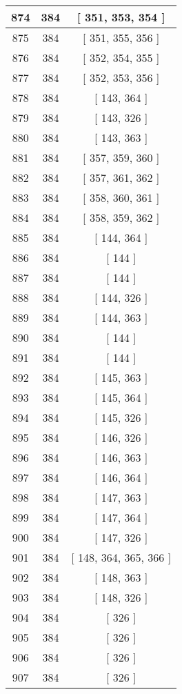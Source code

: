 \begin{center}
\begin{longtable}[H]{|| c c c ||}
\hline
874 & 384 & [ 351, 353, 354 ] \\ 
\hline
875 & 384 & [ 351, 355, 356 ] \\ 
\hline
876 & 384 & [ 352, 354, 355 ] \\ 
\hline
877 & 384 & [ 352, 353, 356 ] \\ 
\hline
878 & 384 & [ 143, 364 ] \\ 
\hline
879 & 384 & [ 143, 326 ] \\ 
\hline
880 & 384 & [ 143, 363 ] \\ 
\hline
881 & 384 & [ 357, 359, 360 ] \\ 
\hline
882 & 384 & [ 357, 361, 362 ] \\ 
\hline
883 & 384 & [ 358, 360, 361 ] \\ 
\hline
884 & 384 & [ 358, 359, 362 ] \\ 
\hline
885 & 384 & [ 144, 364 ] \\ 
\hline
886 & 384 & [ 144 ] \\ 
\hline
887 & 384 & [ 144 ] \\ 
\hline
888 & 384 & [ 144, 326 ] \\ 
\hline
889 & 384 & [ 144, 363 ] \\ 
\hline
890 & 384 & [ 144 ] \\ 
\hline
891 & 384 & [ 144 ] \\ 
\hline
892 & 384 & [ 145, 363 ] \\ 
\hline
893 & 384 & [ 145, 364 ] \\ 
\hline
894 & 384 & [ 145, 326 ] \\ 
\hline
895 & 384 & [ 146, 326 ] \\ 
\hline
896 & 384 & [ 146, 363 ] \\ 
\hline
897 & 384 & [ 146, 364 ] \\ 
\hline
898 & 384 & [ 147, 363 ] \\ 
\hline
899 & 384 & [ 147, 364 ] \\ 
\hline
900 & 384 & [ 147, 326 ] \\ 
\hline
901 & 384 & [ 148, 364, 365, 366 ] \\ 
\hline
902 & 384 & [ 148, 363 ] \\ 
\hline
903 & 384 & [ 148, 326 ] \\ 
\hline
904 & 384 & [ 326 ] \\ 
\hline
905 & 384 & [ 326 ] \\ 
\hline
906 & 384 & [ 326 ] \\ 
\hline
907 & 384 & [ 326 ] \\ 
\hline

\end{longtable}
\end{center}
